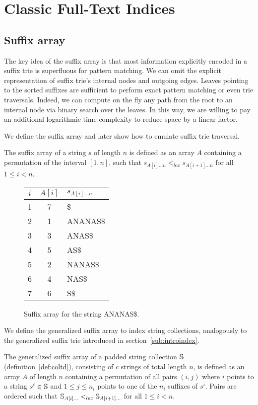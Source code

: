 \section{Classic Full-Text Indices}

\subsection{Suffix array}

The key idea of the suffix array \citep{Manber1990} is that most information explicitly encoded in a suffix trie is superfluous for pattern matching.
We can omit the explicit representation of suffix trie's internal nodes and outgoing edges.
Leaves pointing to the sorted suffixes are sufficient to perform exact pattern matching or even trie traversals.
Indeed, we can compute on the fly any path from the root to an internal node via binary search over the leaves.
In this way, we are willing to pay an additional logarithmic time complexity to reduce space by a linear factor.

We define the suffix array and later show how to emulate suffix trie traversal.
\begin{definition}
The suffix array of a string $s$ of length $n$ is defined as an array $A$ containing a permutation of the interval $[1,n]$, such that $s_{A[i] \dots n} <_{lex} s_{A[i+1] \dots n}$ for all $1 \leq i < n$.
\end{definition}

\begin{figure}[h]
\begin{center}
\caption[Example of suffix array]{Suffix array for the string {\ttfamily ANANAS\$}.}
\label{fig:sa}
\ttfamily
\begin{tabular}{ccl}
$i$ & $A[i]$ & $s_{A[i]\dots n}$\\
\midrule
1 & 7 & \$\\
2 & 1 & ANANAS\$\\
3 & 3 & ANAS\$\\
4 & 5 & AS\$\\
5 & 2 & NANAS\$\\
6 & 4 & NAS\$\\
7 & 6 & S\$\\
\end{tabular}
\end{center}
\end{figure}

We define the generalized suffix array to index string collections, analogously to the generalized suffix trie introduced in section~\ref{sub:introindex}.
\begin{definition}
The generalized suffix array of a padded string collection $\mathbb {S}$ (definition~\ref{def:coltd}), consisting of $c$ strings of total length $n$, is defined as an array $A$ of length $n$ containing a permutation of all pairs $(i,j)$ where $i$ points to a string $s^i \in \mathbb {S}$ and $1 \leq j \leq n_i$ points to one of the $n_i$ suffixes of $s^i$.
Pairs are ordered such that $\mathbb {S}_{A[i] \dots} <_{lex} \mathbb {S}_{A[i+1] \dots}$ for all $1 \leq i < n$.
\end{definition}

